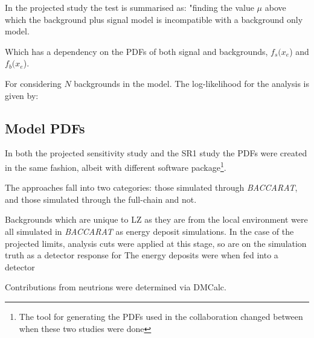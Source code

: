 \par
In the projected study the test is summarised as:
"finding the value $\mu$ above which the background plus signal model is incompatible with a background only model.

Which has a dependency on the PDFs of both signal and backgrounds, $f_s($\textbf{$x_e$}) and $f_b($\textbf{$x_e$}).

For considering $N$ backgrounds in the model.
The log-likelihood for the analysis is given by:



\subsection{Model PDFs}
\par
In both the projected sensitivity study and the SR1 study the PDFs were created in the same fashion, albeit with different software package\footnote{The tool for generating the PDFs used in the collaboration changed between when these two studies were done}.



The approaches fall into two categories: those simulated through \textit{BACCARAT}, and those  simulated through the full-chain and not.

\par
Backgrounds which are unique to LZ as they are from the local environment were all simulated in \textit{BACCARAT} as energy deposit simulations.
In the case of the projected limits, analysis cuts were applied at this stage, so are on the simulation truth as a detector response for 
The energy deposits were when fed into a detector


\par

Contributions from neutrions were determined via DMCalc. 



